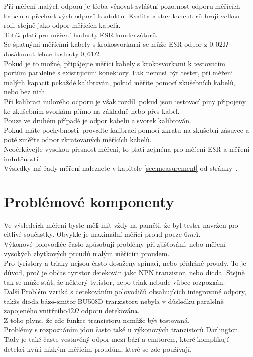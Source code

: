 Při měření malých odporů je třeba věnovat zvláštní pozornost odporu měřících kabelů a přechodových odporů kontaktů.
Kvalita a stav konektorů hrají velkou roli, stejně jako odpor měřicích kabelů.\\
Totéž platí pro měření hodnoty ESR kondenzátorů.\\
Se špatnými měřícími kabely s krokosvorkami se může ESR odpor z \(0,02\Omega\) dosáhnout lehce hodnoty \(0,61\Omega\).\\
Pokud je to možné, připájejte měřící kabely s krokosvorkami k testovacím portům paralelně s existujícími konektory.
Pak nemusí být tester, při měření malých kapacit pokaždé kalibrován, pokud měříte pomocí zkušebních kabelů, nebo bez nich.\\
Při kalibraci nulového odporu je však rozdíl, pokud jsou testovací piny připojeny ke zkušebním svorkám přímo na základně nebo přes kabel.\\ Pouze ve druhém případě je odpor kabelu a svorek kalibrován.\\Pokud máte pochybnosti, proveďte kalibraci pomocí zkratu na zkušební zásuvce a poté změřte odpor zkratovaných měřících kabelů.\\
Neočekávejte vysokou přesnost měření, to platí zejména pro měření ESR a měření indukčnosti.
\\Výsledky mé řady měření naleznete v kapitole \ref{sec:measurement} od stránky~\pageref{sec:measurement}.



\section{Problémové komponenty}
Ve výsledcích měření byste měli mít vždy na paměti, že byl tester navržen pro citlivé součástky. Obvykle je maximální měřící proud pouze \(6mA\).\\
Výkonové polovodiče často způsobují problémy při zjišťování, nebo měření vysokých zbytkových proudů malým měřícím proudem.\\
Pro tyristory a triaky nejsou často dosaženy spínací, nebo přídržné proudy. To je důvod, proč je občas tyristor detekován jako NPN tranzistor, nebo dioda. Stejně tak se může stát, že některý tyristor, nebo triak nebude vůbec rozpoznán.\\
Další Problém vzniká s detekováním polovodičů obsahujících integrované odpory, takže dioda báze-emitor BU508D
tranzistoru nebyla v důsledku paralelně zapojeného vnitřního\(42 \Omega\) odporu detekována.\\
Z toho plyne, že zde funkce tranzistoru nemůže být testovaná.\\
Problémy s rozpoznáním jdou často také u výkonových tranzistorů Darlington. Tady je také
často vestavěný odpor mezi bází a emitorem, které komplikují detekci kvůli nízkým měřicím proudům, které se zde používají.

